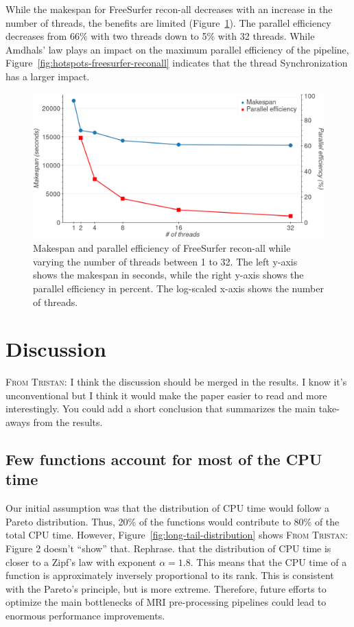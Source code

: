 \documentclass[conference]{IEEEtran}
\newcommand{\TG}[1]{\color{blue}\textsc{From Tristan: }#1\color{black}}
\begin{document}
While the makespan for FreeSurfer recon-all decreases with an increase in the number of threads, the benefits are limited (Figure~\ref{fig:freesurfer-threading}). The parallel efficiency decreases from 66\% with two threads down to 5\% with 32 threads. While Amdhals' law plays an impact on the maximum parallel efficiency of the pipeline, Figure~\ref{fig:hotspots-freesurfer-reconall} indicates that the thread Synchronization has a larger impact.
					
\begin{figure}
	\includegraphics[width=\linewidth]{figures/makespan-freesurfer.png}
	\caption{Makespan and parallel efficiency of FreeSurfer recon-all while varying the number of threads between 1 to 32. The left y-axis shows the makespan in seconds, while the right y-axis shows the parallel efficiency in percent. The log-scaled x-axis shows the number of threads.}
	\label{fig:freesurfer-threading}
\end{figure}
								
\section{Discussion}

\TG{I think the discussion should be merged in the results. I know it's unconventional but I think it would make the paper easier to read and more interestingly. You could add a short conclusion that summarizes the main take-aways from the results.}

\subsection{Few functions account for most of the CPU time}
Our initial assumption was that the distribution of CPU time would follow a Pareto distribution. Thus, 20\% of the functions would contribute to 80\% of the total CPU time. However, Figure~\ref{fig:long-tail-distribution} shows \TG{Figure 2 doesn't ``show'' that. Rephrase.} that the distribution of CPU time is closer to a Zipf's law with exponent $\alpha=1.8$. This means that the CPU time of a function is approximately inversely proportional to its rank. This is consistent with the Pareto's principle, but is more extreme. Therefore, future efforts to optimize the main bottlenecks of MRI pre-processing pipelines could lead to enormous performance improvements.
			
\end{document}
